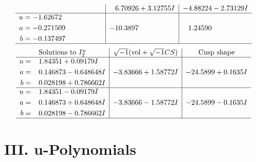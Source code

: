\documentclass[1p]{elsarticle_modified}
\theoremstyle{definition}
\newcommand{\I}{\sqrt{-1}}
\begin{document}
$$\begin{array}{c|c|c}
 & \phantom{-}6.70926 + 3.12755 I & -4.88224 - 2.73129 I \\ \hline\begin{aligned}
u &= -1.62672\phantom{ +0.000000I} \\
a &= -0.271509\phantom{ +0.000000I} \\
b &= -0.137497\phantom{ +0.000000I}\end{aligned}
 & -10.3897\phantom{ +0.000000I} & \phantom{-}1.24590\phantom{ +0.000000I}\\
 \hline 
 \end{array}$$\newpage$$\begin{array}{c|c|c}  
\text{Solutions to }I^u_{2}& \I (\text{vol} + \sqrt{-1}CS) & \text{Cusp shape}\\
 \hline 
\begin{aligned}
u &= \phantom{-}1.84351 + 0.09179 I \\
a &= \phantom{-}0.146873 - 0.648648 I \\
b &= \phantom{-}0.028198 + 0.786662 I\end{aligned}
 & -3.83666 + 1.58772 I & -24.5899 + 0.1635 I \\ \hline\begin{aligned}
u &= \phantom{-}1.84351 - 0.09179 I \\
a &= \phantom{-}0.146873 + 0.648648 I \\
b &= \phantom{-}0.028198 - 0.786662 I\end{aligned}
 & -3.83666 - 1.58772 I & -24.5899 - 0.1635 I\\
 \hline 
 \end{array}$$\newpage
\newpage\renewcommand{\arraystretch}{1}
\centering \section*{ III. u-Polynomials}
\end{document}
